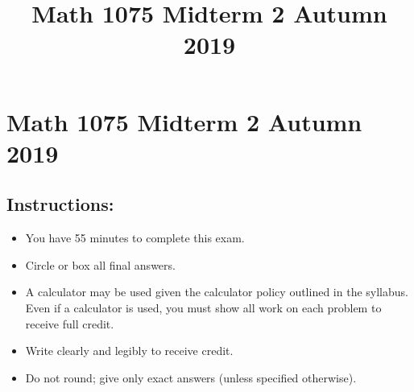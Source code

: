 \documentclass{ximera}
\title{Math 1075 Midterm 2 Autumn 2019}
\begin{document}
\section*{Math 1075 Midterm 2 Autumn 2019}
\subsection*{Instructions:}
\begin{itemize}
  \item You have 55 minutes to complete this exam.
  \item Circle or box all final answers.
  \item A calculator may be used given the calculator policy outlined in the syllabus. Even if a calculator is used, you must show all work on each problem to receive full credit.
  \item Write clearly and legibly to receive credit.
  \item Do not round; give only exact answers (unless specified otherwise).
\end{itemize}
\end{document}
